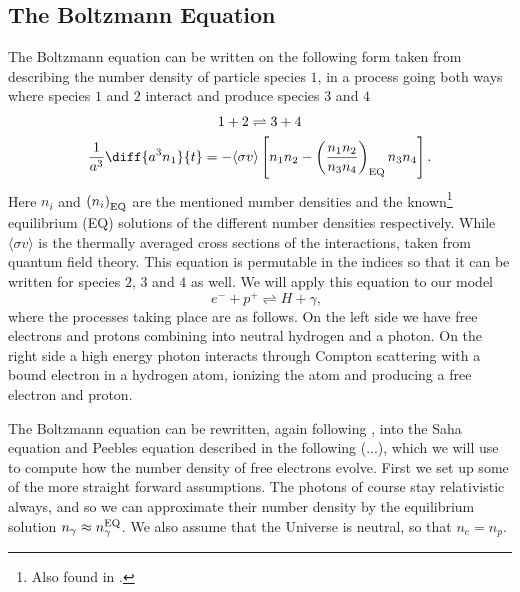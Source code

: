 \documentclass[10pt,a4paper]{article}
\begin{document}
\subsection{The Boltzmann Equation}
\label{subsec:Theory/Boltzmann eq}
The Boltzmann equation can be written on the following form taken from \cite[p. 61]{Dodelson} describing the number density of particle species $1$, in a process going both ways where species $1$ and $2$ interact and produce species $3$ and $4$
\begin{gather}
    1+2  \rightleftharpoons 3+ 4 \notag
    \\
    \frac{1}{a^3}\diff{a^3n_1}{t} = - \langle \sigma v \rangle \left[n_1n_2 - \left(\frac{n_1n_2}{n_3n_4}\right)_{\rm{EQ}}n_3n_4\right].
    \label{eq:Boltzmann species}
\end{gather}
Here $n_i$ and $\left(n_i\right)_{\rm{EQ}}$ are the mentioned number densities and the known\footnote{Also found in \cite[p. 61]{Dodelson}.} equilibrium (EQ) solutions of the different number densities respectively. While $\langle \sigma v \rangle$ is the thermally averaged cross sections of the interactions, taken from quantum field theory. This equation is permutable in the indices so that it can be written for species $2$, $3$ and $4$ as well. We will apply this equation to our model 
\begin{equation}
    \quad e^{-} + p^{+} \rightleftharpoons H + \gamma,
    \label{eq:process}
\end{equation}
where the processes taking place are as follows. On the left side we have free electrons and protons combining into neutral hydrogen and a photon. On the right side a high energy photon interacts through Compton scattering with a bound electron in a hydrogen atom, ionizing the atom and producing a free electron and proton.

The Boltzmann equation can be rewritten, again following \cite{Dodelson}, into the Saha equation and Peebles equation described in the following (...), which we will use to compute how the number density of free electrons evolve. First we set up some of the more straight forward assumptions. The photons of course stay relativistic always, and so we can approximate their number density by the equilibrium solution $n_\gamma \approx n_\gamma^{\rm{EQ}}$. We also assume that the Universe is neutral, so that $n_e = n_p$. 
\end{document}
